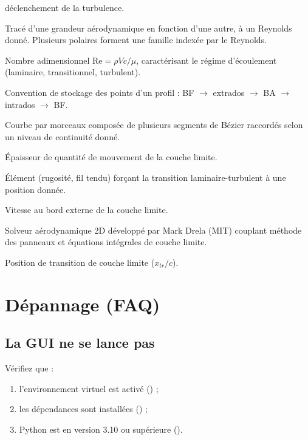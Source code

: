 \begin{description}
        déclenchement de la turbulence.
    \item[Polaire] Tracé d'une grandeur aérodynamique en
        fonction d'une autre, à un Reynolds donné. Plusieurs
        polaires forment une famille indexée par le Reynolds.
    \item[Reynolds] Nombre adimensionnel
        $\mathrm{Re} = \rho V c / \mu$, caractérisant le régime
        d'écoulement (laminaire, transitionnel, turbulent).
    \item[Selig] Convention de stockage des points d'un profil :
        BF $\to$ extrados $\to$ BA $\to$ intrados $\to$ BF.
    \item[Spline] Courbe par morceaux composée de plusieurs
        segments de Bézier raccordés selon un niveau de continuité
        donné.
    \item[$\theta$] Épaisseur de quantité de mouvement de la
        couche limite.
    \item[Trip / Turbulator] Élément (rugosité, fil tendu) forçant
        la transition laminaire-turbulent à une position donnée.
    \item[$U_e$] Vitesse au bord externe de la couche limite.
    \item[XFoil] Solveur aérodynamique 2D développé par Mark Drela
        (MIT) couplant méthode des panneaux et équations intégrales
        de couche limite.
    \item[XTR] Position de transition de couche limite ($x_{tr}/c$).
\end{description}

\section{Dépannage (FAQ)}

\subsection*{La GUI ne se lance pas}

Vérifiez que :

\begin{enumerate}
    \item l'environnement virtuel est activé () ;
    \item les dépendances sont installées () ;
    \item Python est en version 3.10 ou supérieure
        ().
\end{enumerate}

